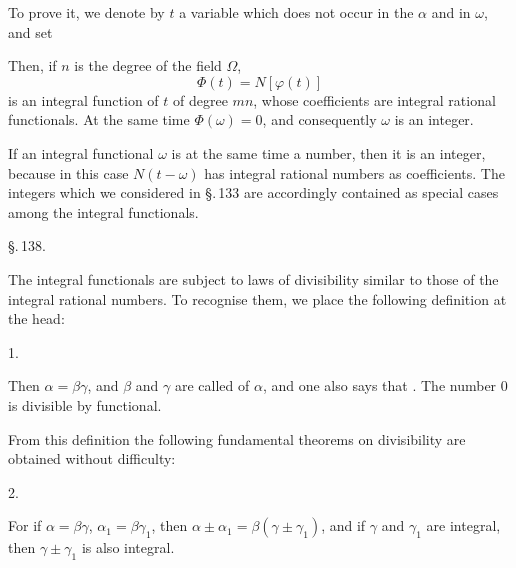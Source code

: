 
To prove it, we denote by $t$ a variable which does not occur in the $\alpha$ and in $\omega$, and set


Then, if $n$ is the degree of the field $\Omega$,
\[
\Phi(t) = N[\varphi(t)]
\]
is an integral function of $t$ of degree $mn$, whose coefficients are integral rational functionals. At the same time $\Phi(\omega) = 0$, and consequently $\omega$ is an integer.


If an integral functional $\omega$ is at the same time a number, then it is an integer, because in this case $N(t-\omega)$ has integral rational numbers as coefficients. The integers which we considered in \S.\,133 are accordingly contained as special cases among the integral functionals.

\S.\,138.


The integral functionals are subject to laws of divisibility similar to those of the integral rational numbers. To recognise them, we place the following definition at the head:

1. 

Then $\alpha=\beta\gamma$, and $\beta$ and $\gamma$ are called  of $\alpha$, and one also says that . The number 0 is divisible by  functional.

From this definition the following fundamental theorems on divisibility are obtained without difficulty:

2. 

For if $\alpha=\beta\gamma$, $\alpha_1=\beta\gamma_1$, then $\alpha\pm\alpha_1=\beta(\gamma\pm\gamma_1)$, and if $\gamma$ and $\gamma_1$ are integral, then $\gamma\pm\gamma_1$ is also integral. %

